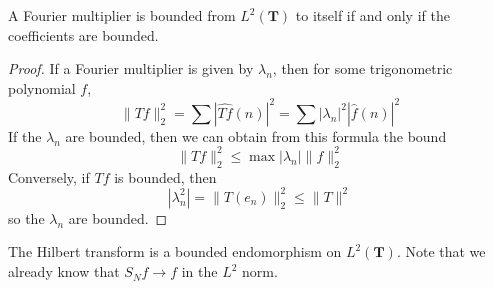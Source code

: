 \begin{theorem}
	A Fourier multiplier is bounded from $L^2(\mathbf{T})$ to itself if and only if the coefficients are bounded.
\end{theorem}
\begin{proof}
	If a Fourier multiplier is given by $\lambda_n$, then for some trigonometric polynomial $f$,
	\[ \| Tf \|_2^2 = \sum \left|\widehat{Tf}(n) \right|^2 = \sum |\lambda_n|^2 \left| \widehat{f}(n) \right|^2 \]
	If the $\lambda_n$ are bounded, then we can obtain from this formula the bound
	\[ \| Tf \|_2^2 \leq \max |\lambda_n| \| f \|_2^2 \]
	Conversely, if $Tf$ is bounded, then
	\[ |\lambda_n^2| = \| T(e_n) \|_2^2 \leq \| T \|^2 \]
	so the $\lambda_n$ are bounded.
\end{proof}

\begin{corollary}
	The Hilbert transform is a bounded endomorphism on $L^2(\mathbf{T})$. Note that we already know that $S_N f \to f$ in the $L^2$ norm.
\end{corollary}

